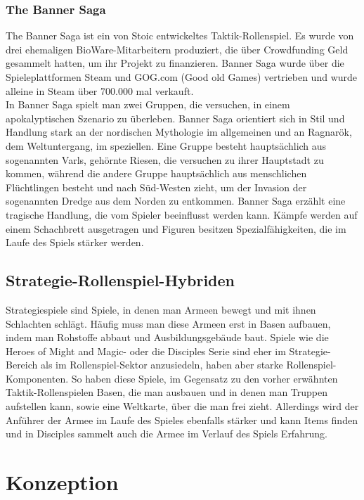 \documentclass[extern,palatino]{cgBA}
\begin{document}
	\subsubsection{The Banner Saga}
	The Banner Saga ist ein von Stoic entwickeltes Taktik-Rollenspiel. Es wurde von drei ehemaligen BioWare-Mitarbeitern produziert, die über Crowdfunding Geld gesammelt hatten, um ihr Projekt zu finanzieren. Banner Saga wurde über die Spieleplattformen Steam und GOG.com (Good old Games) vertrieben und wurde alleine in Steam über 700.000 mal\cite{trpgbsss} verkauft.
	\\In Banner Saga spielt man zwei Gruppen, die versuchen, in einem apokalyptischen Szenario zu überleben. Banner Saga orientiert sich in Stil und Handlung stark an der nordischen Mythologie im allgemeinen und an Ragnarök, dem Weltuntergang, im speziellen\cite{trpgbswiki}. Eine Gruppe besteht hauptsächlich aus sogenannten Varls, gehörnte Riesen, die versuchen zu ihrer Hauptstadt zu kommen, während die andere Gruppe hauptsächlich aus menschlichen Flüchtlingen besteht und nach Süd-Westen zieht, um der Invasion der sogenannten Dredge aus dem Norden zu entkommen.
	Banner Saga erzählt eine tragische Handlung, die vom Spieler beeinflusst werden kann. Kämpfe werden auf einem Schachbrett ausgetragen und Figuren besitzen Spezialfähigkeiten, die im Laufe des Spiels stärker werden. 
	\subsection{Strategie-Rollenspiel-Hybriden} Strategiespiele sind Spiele, in denen man Armeen bewegt und mit ihnen Schlachten schlägt. Häufig muss man diese Armeen erst in Basen aufbauen, indem man Rohstoffe abbaut und Ausbildungsgebäude baut. Spiele wie die Heroes of Might and Magic- oder die Disciples Serie sind eher im Strategie-Bereich als im Rollenspiel-Sektor anzusiedeln, haben aber starke Rollenspiel-Komponenten. So haben diese Spiele, im Gegensatz zu den vorher erwähnten Taktik-Rollenspielen Basen, die man ausbauen und in denen man Truppen aufstellen kann, sowie eine Weltkarte, über die man frei zieht. Allerdings wird der Anführer der Armee im Laufe des Spieles ebenfalls stärker und kann Items finden und in Disciples sammelt auch die Armee im Verlauf des Spiels Erfahrung.
	
	\newpage
\section {Konzeption}\label{konz}
\end{document}
